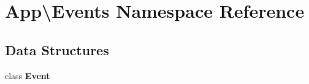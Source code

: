 \section{App\textbackslash{}Events Namespace Reference}
\label{namespace_app_1_1_events}
\subsection*{Data Structures}
\begin{DoxyCompactItemize}
\item 
class {\bf Event}
\end{DoxyCompactItemize}
